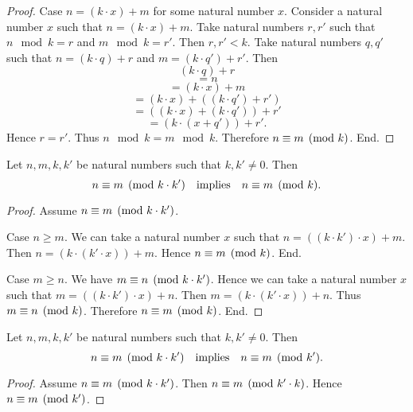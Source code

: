 \documentclass[../arithmetic.tex]{subfiles}
\begin{document}
\begin{forthel}
\begin{proof}
      Case $n = (k \cdot x) \plus m$ for some natural number $x$.
        Consider a natural number $x$ such that $n = (k \cdot x) \plus m$.
        Take natural numbers $r, r'$ such that $n \mod k = r$ and
        $m \mod k = r'$.
        Then $r, r' \less k$.
        Take natural numbers $q, q'$ such that $n = (k \cdot q) \plus r$ and
        $m = (k \cdot q') \plus r'$.
        Then
        \[  (k \cdot q) \plus r                         \]
        \[    = n                                   \]
        \[    = (k \cdot x) \plus m                     \]
        \[    = (k \cdot x) \plus ((k \cdot q') \plus r')   \]
        \[    = ((k \cdot x) \plus (k \cdot q')) \plus r'   \]
        \[    = (k \cdot (x \plus q')) \plus r'.            \]
        Hence $r = r'$.
        Thus $n \mod k = m \mod k$.
        Therefore $n\equiv m\pmod{k}$.
      End.
    \end{proof}
  \end{forthel}

  \begin{forthel}
    \begin{proposition}
      Let $n, m, k, k'$ be natural numbers such that $k, k' \neq 0$.
      Then \[ n\equiv m\pmod{k \cdot k'} \quad \text{implies} \quad n\equiv m\pmod{k}. \]
    \end{proposition}
    \begin{proof}
      Assume $n\equiv m\pmod{k \cdot k'}$.

      Case $n \geq m$.
        We can take a natural number $x$ such that
        $n = ((k \cdot k') \cdot x) \plus m$.
        Then $n = (k \cdot (k' \cdot x)) \plus m$.
        Hence $n\equiv m\pmod{k}$.
      End.

      Case $m \geq n$.
        We have $m\equiv n\pmod{k \cdot k'}$.
        Hence we can take a natural number $x$ such that
        $m = ((k \cdot k') \cdot x) \plus n$.
        Then $m = (k \cdot (k' \cdot x)) \plus n$.
        Thus $m\equiv n\pmod{k}$.
        Therefore $n\equiv m\pmod{k}$.
      End.
    \end{proof}
  \end{forthel}

  \begin{forthel}
    \begin{corollary}
      Let $n, m, k, k'$ be natural numbers such that $k, k' \neq 0$.
      Then \[ n\equiv m\pmod{k \cdot k'} \quad \text{implies} \quad n\equiv m\pmod{k'}. \]
    \end{corollary}
    \begin{proof}
      Assume $n\equiv m\pmod{k \cdot k'}$.
      Then $n\equiv m\pmod{k' \cdot k}$.
      Hence $n\equiv m\pmod{k'}$.
    \end{proof}
  \end{forthel}
\end{document}
